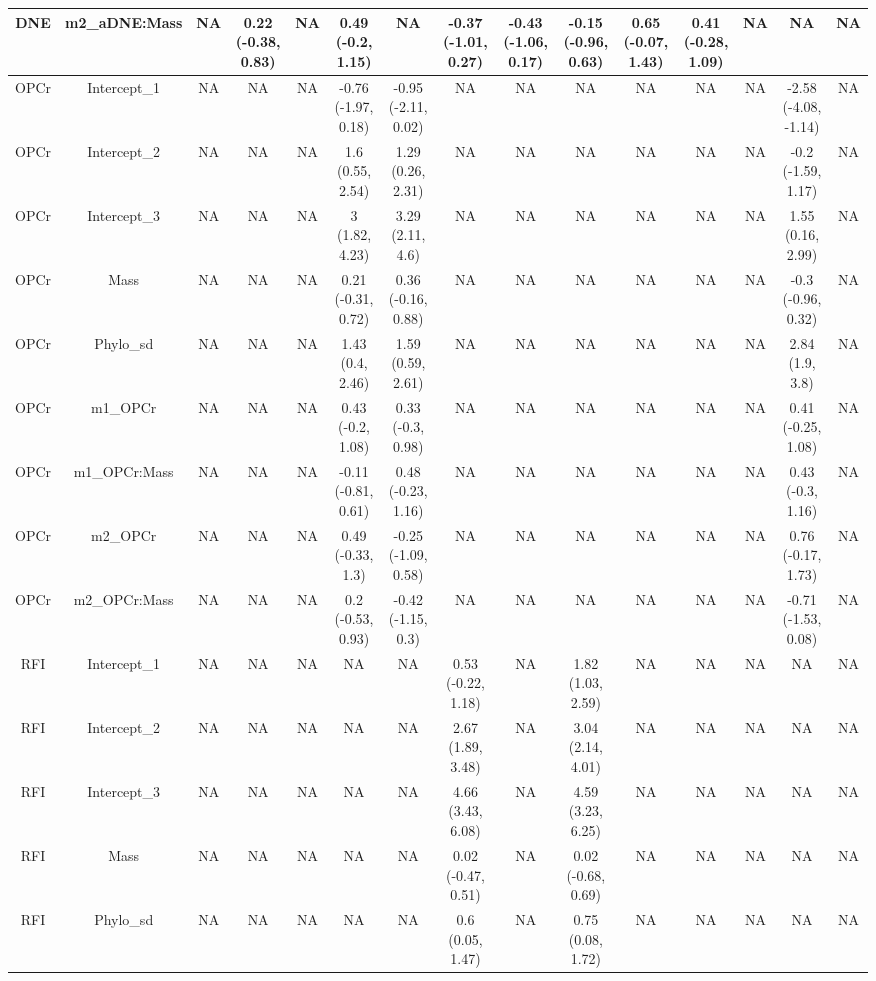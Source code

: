 \begin{longtable}[t]{c|c|c|c|c|c|c|c|c|c|c|c|c|c|c}
\hline
DNE & m2_aDNE:Mass & NA & 0.22 (-0.38, 0.83) & NA & 0.49 (-0.2, 1.15) & NA & -0.37 (-1.01, 0.27) & -0.43 (-1.06, 0.17) & -0.15 (-0.96, 0.63) & 0.65 (-0.07, 1.43) & 0.41 (-0.28, 1.09) & NA & NA & NA\\
\hline
OPCr & Intercept_1 & NA & NA & NA & -0.76 (-1.97, 0.18) & -0.95 (-2.11, 0.02) & NA & NA & NA & NA & NA & NA & -2.58 (-4.08, -1.14) & NA\\
\hline
OPCr & Intercept_2 & NA & NA & NA & 1.6 (0.55, 2.54) & 1.29 (0.26, 2.31) & NA & NA & NA & NA & NA & NA & -0.2 (-1.59, 1.17) & NA\\
\hline
OPCr & Intercept_3 & NA & NA & NA & 3 (1.82, 4.23) & 3.29 (2.11, 4.6) & NA & NA & NA & NA & NA & NA & 1.55 (0.16, 2.99) & NA\\
\hline
OPCr & Mass & NA & NA & NA & 0.21 (-0.31, 0.72) & 0.36 (-0.16, 0.88) & NA & NA & NA & NA & NA & NA & -0.3 (-0.96, 0.32) & NA\\
\hline
OPCr & Phylo_sd & NA & NA & NA & 1.43 (0.4, 2.46) & 1.59 (0.59, 2.61) & NA & NA & NA & NA & NA & NA & 2.84 (1.9, 3.8) & NA\\
\hline
OPCr & m1_OPCr & NA & NA & NA & 0.43 (-0.2, 1.08) & 0.33 (-0.3, 0.98) & NA & NA & NA & NA & NA & NA & 0.41 (-0.25, 1.08) & NA\\
\hline
OPCr & m1_OPCr:Mass & NA & NA & NA & -0.11 (-0.81, 0.61) & 0.48 (-0.23, 1.16) & NA & NA & NA & NA & NA & NA & 0.43 (-0.3, 1.16) & NA\\
\hline
OPCr & m2_OPCr & NA & NA & NA & 0.49 (-0.33, 1.3) & -0.25 (-1.09, 0.58) & NA & NA & NA & NA & NA & NA & 0.76 (-0.17, 1.73) & NA\\
\hline
OPCr & m2_OPCr:Mass & NA & NA & NA & 0.2 (-0.53, 0.93) & -0.42 (-1.15, 0.3) & NA & NA & NA & NA & NA & NA & -0.71 (-1.53, 0.08) & NA\\
\hline
RFI & Intercept_1 & NA & NA & NA & NA & NA & 0.53 (-0.22, 1.18) & NA & 1.82 (1.03, 2.59) & NA & NA & NA & NA & NA\\
\hline
RFI & Intercept_2 & NA & NA & NA & NA & NA & 2.67 (1.89, 3.48) & NA & 3.04 (2.14, 4.01) & NA & NA & NA & NA & NA\\
\hline
RFI & Intercept_3 & NA & NA & NA & NA & NA & 4.66 (3.43, 6.08) & NA & 4.59 (3.23, 6.25) & NA & NA & NA & NA & NA\\
\hline
RFI & Mass & NA & NA & NA & NA & NA & 0.02 (-0.47, 0.51) & NA & 0.02 (-0.68, 0.69) & NA & NA & NA & NA & NA\\
\hline
RFI & Phylo_sd & NA & NA & NA & NA & NA & 0.6 (0.05, 1.47) & NA & 0.75 (0.08, 1.72) & NA & NA & NA & NA & NA\\

\end{longtable}
